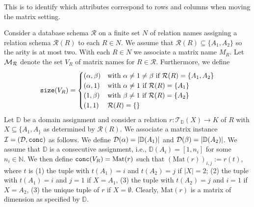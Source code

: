 This is to identify which attributes correspond to rows and columns when moving the matrix setting. 


Consider a database schema $\mathcal{R}$ on a finite set $N$ of relation names
 assigning a relation schema $\mathcal{R}(R)$ to each $R \in N$. We assume that 
 $\mathcal{R}(R)\subseteq\{A_1,A_2\}$ so the arity is at most two. With each
 $R\in N$ we associate a matrix name $M_R$. Let $\mathcal{M}_{\mathcal{R}}$ denote the set
 $V_R$ of matrix names for $R\in\mathcal{R}$. Furthermore, we define 
 $$
\texttt{size}(V_R)=\begin{cases}
(\alpha,\beta) & \text{with $\alpha\neq 1\neq\beta$ if $\mathcal{R}(R)=\{A_1,A_2\}$}\\
(\alpha,1) & \text{with $\alpha\neq 1$ if $\mathcal{R}(R)=\{A_1\}$}\\
(1,\beta) & \text{with $\beta\neq 1$ if $\mathcal{R}(R)=\{A_2\}$}\\
(1,1) & \text{$\mathcal{R}(R)=\{\}$}
\end{cases}
 $$
Let $\mathbb{D}$ be a domain assignment and consider 
a relation $r:
\mathcal{T}_{\mathbb{D}}(X) \to K$ of $R$ with $X\subseteq\{A_1,A_\}$ as determined by
$\mathcal{R}(R)$. We associate a matrix instance $\mathcal{I} = (\mathcal{D},\texttt{conc})$ as follows.
We define $\mathcal{D}(\alpha)=|\mathbb{D}(A_1)|$ and
$\mathcal{D}(\beta)=|\mathbb{D}(A_2)|$. We assume that $\mathbb{D}$ is a consecutive assignment, i.e.,
$\mathbb{D}(A_i)=[1,n_i]$ for some $n_i\in\mathbb{N}$. We then define
$\texttt{conc}(V_R)=\text{Mat}(r)$ such that 
$(\text{Mat}(r))_{i,j} := r(t)$, where $t$ is (1) the tuple with $t(A_1) = i$ and $t(A_2) = j$ if $|X| = 2$; (2) the tuple with $t(A_1) = i$ and $j = 1$ if $X = {A_1}$,
(3) the tuple with $t(A_2) = j$ and $i = 1$ if $X = {A_2}$,
(3) the unique tuple of $r$ if $X=\emptyset$. Clearly, $\text{Mat}(r)$ is a matrix of dimension as
specified by $\mathbb{D}$. 
%
%
%
%
%
